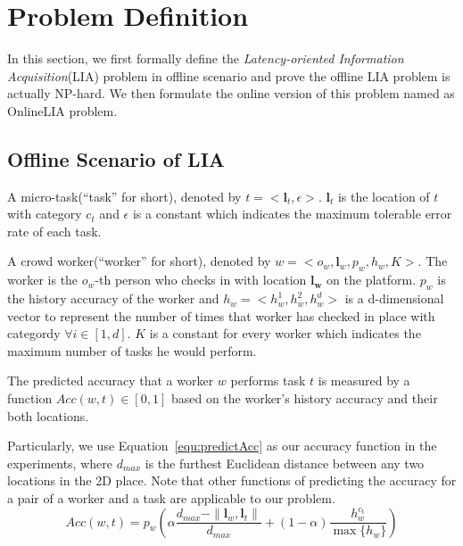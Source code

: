 \section{Problem Definition}
\label{sec:definition}
In this section, we first formally define the \textit{Latency-oriented Information Acquisition}(LIA) problem in offline scenario and 
prove the offline LIA problem is actually NP-hard. We then formulate the online version of this problem named as OnlineLIA problem.

\subsection{Offline Scenario of LIA}

\begin{definition}
\label{def:task}
A micro-task(``task'' for short), denoted by $t = <\boldsymbol{l}_t, \epsilon>$.
$\boldsymbol{l}_t$ is the location of $t$ with category $c_t$ and $\epsilon$ is a constant which indicates
the maximum tolerable error rate of each task.
\end{definition}

\begin{definition}
\label{def:worker}
A crowd worker(``worker'' for short), denoted by $w = <o_w, \boldsymbol{l}_w, p_w, h_w, K>$.
The worker is the $o_w$-th person who checks in with location $\boldsymbol{l_w}$ on the platform.
$p_w$ is the history accuracy of the worker and $h_w = <h_w^1, h_w^2,h_w^d>$ is a d-dimensional vector to represent the number of times that worker has checked in place with categordy $\forall i \in [1,d]$.
$K$ is a constant for every worker which indicates the maximum number of tasks he would perform.
\end{definition}

\begin{definition}
\label{def:acc}
The predicted accuracy that a worker $w$ performs task $t$ is measured by a function $Acc(w, t) \in [0,1]$
based on the worker's history accuracy and their both locations.
\end{definition}

Particularly, we use Equation~\ref{equ:predictAcc} as our accuracy function in the experiments, where $d_{max}$ is the furthest Euclidean distance
between any two locations in the 2D place. 
Note that other functions of predicting the accuracy for a pair of a worker and a task are applicable to our problem.
\begin{equation}
\label{equ:predictAcc}
Acc(w, t) = p_w (\alpha \frac{d_{max}-\|\boldsymbol{l}_w, \boldsymbol{l}_t\|}{d_{max}} + (1-\alpha)\frac{h_w^{c_t}}{\max\{h_w\}})
\end{equation}

